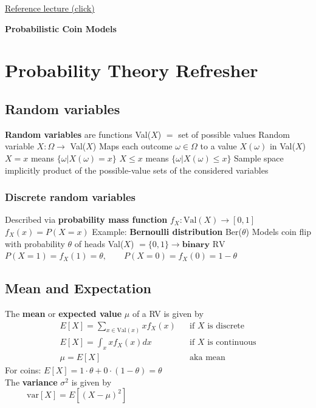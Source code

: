 \documentclass{article}
\begin{document}
	\href{https://mycourses.unh.edu/courses/152824/files/folder/lecture?preview=15873135}{\textsf{Reference lecture (click)}}\\
	\begin{center}
		{\huge\bf Probabilistic Coin Models}
	\end{center}
	\section{Probability Theory Refresher}
	\subsection{Random variables}
	\begin{outline}
		\1 \textbf{Random variables} are functions
		\2 Val($X$) $=$ set of possible values
		\2 Random variable $X : \Omega \rightarrow$ Val($X$)
		\3 Maps each outcome $\omega \in \Omega$ to a value $X(\omega)$ in Val($X$)
		\2 $X = x$ means $\{\omega | X(\omega) = x\}$
		\2 $X \leq x$ means $\{\omega | X(\omega) \leq x\}$
		\2 Sample space implicitly product of the possible-value sets of the considered variables
	\end{outline}
	\subsubsection{Discrete random variables}
	\begin{outline}
		\1 Described via \textbf{probability mass function} $f_X : \text{Val}(X) \rightarrow [0,1]$
		\2 $f_X(x) = P(X = x)$
		\1 Example: \textbf{Bernoulli distribution} Ber($\theta$)
		\2 Models coin flip with probability $\theta$ of heads
		\2 Val($X$) $= \{ 0, 1 \} \rightarrow \textbf{binary }\text{RV}$
		\2 $P(X = 1) = f_X(1) = \theta, \qquad P(X = 0) = f_X(0) = 1 - \theta$
	\end{outline}
	\subsection{Mean and Expectation}
	The \textbf{mean} or \textbf{expected value} $\mu$ of a RV is given by
	\begin{align*}
		& E[X] = \sum_{x \in \text{Val}(x)}xf_X(x) && \text{if $X$ is discrete}&\\
		& E[X] = \int_{x} xf_X(x) dx && \text{if $X$ is continuous} &\\
		& \mu = E[X] && \text{aka mean} &
	\end{align*}
	For coins: $E[X] = 1 \cdot \theta + 0 \cdot (1 - \theta) = \theta$\\
	The \textbf{variance} $\sigma^2$ is given by
	\[ \text{var}[X] = E[(X - \mu)^2] \hspace{8cm} \]
\end{document}
